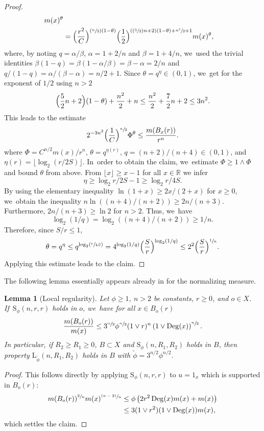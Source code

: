 \documentclass[10pt]{amsart}
\newcommand{\Psfrac}[2]{(\sfrac{#1}{#2})}
\newcommand{\psfrac}[2]{\sfrac{(#1)}{#2}}
\newcommand{\rS}{\mathrm{S}}
\newcommand{\rL}{\mathrm{L}}
\theoremstyle{plain}
\newtheorem{lemma}[theorem]{Lemma}
\theoremstyle{definition}
\newcommand{\RR}{\mathbb{R}}
\DeclareMathOperator{\Deg}{Deg}
\begin{document}
\begin{proof}
{\begin{align*}
m(x)^{{\theta}}
\\
&=\Bigl(\frac{r^2}{C }\Bigr)^{\Psfrac{n}{2}(1- {\theta})}
{\Bigl(\frac12\Bigr)^{(\Psfrac52n+2)(1-\theta)+\sfrac{n^2}{2}+1}}
m(x)^{{\theta}},
\end{align*}}
where, by noting $q=\alpha/\beta$, $\alpha=1+2/n$ and $\beta=1+4/n$, we~used the trivial identities $\beta(1-q)=\beta(1-\alpha/\beta)=\beta-\alpha=2/n$ and
$q/(1-q)=\alpha/(\beta-\alpha)=n/2+1$.
Since $ {\theta}=q^{{\eta}}\in(0,1)$, we~get for the exponent of $1/2$ using $ n>2 $
\[
\Bigl(\frac52n+2\Bigr)(1-\theta)+\frac{n^2}{2}+n
\leq \frac{n^2}{2}+\frac{7}{2}n+2 \leq 3 n^2.
\]
This leads to the estimate
\[
2^{-{3}n^2}\Bigl(\frac{1}{C}\Bigr)^{\sfrac{n}{2}}
\Phi^{\theta }
\leq \frac{m(B_x(r))}{r^{n}}.
\]
where $\Phi= C^{{n}/{2}}{m(x)}/{r^{n}} $,
$ \theta =q^{\eta(r)}$, $q=(n+2)/(n+4)\in(0,1)$, and {$ \eta(r)=\lfloor \log_2 (r/2S) \rfloor$}. In~order to obtain the claim, we~estimate $\Phi\geq 1\wedge \Phi$ and bound $\theta$ from above. From $\lfloor x\rfloor\geq x-1$ for all $x\in\RR$ we infer
\[
\eta\geq \log_2{r/2S}-1\geq \log_2{r/4S}.
\]
{By using the elementary inequality $ \ln (1+x)\ge 2x/(2+x) $ for $ x\ge 0 $, we~obtain the inequality
$ n\ln ((n+4)/(n+2))\ge 2n/(n+3) $. Furthermore, $ 2n/(n+3)\ge \ln 2 $ for $ n>2 $. Thus, we~have
\[
\log_2({1/q})=\log_2({(n+4)/(n+2)})\ge 1/n.
\]
}
Therefore, since $S/r\leq1$,
\[
\theta=q^{\eta}\leq {q}^{\log_2(\sfrac{r}{4S})}=4^{\log_2({1/q})}\Bigl(\frac{S}{r}\Bigr)^{\log_2({1/q})}\leq 2^2\Bigl(\frac{S}{r}\Bigr)^{\sfrac{1}{n}}.
\]
Applying this estimate leads to the claim.
\end{proof}

The following lemma essentially appears already in \cite[Lem.\,6.2]{KellerRose-22a} for the normalizing measure.

\begin{lemma}[Local regularity]
\label{lemma:gammanormalized} Let $\phi\geq 1$, $n>2$ be constants, $r \ge 0$, and $o\in X$. If~$\rS_{\phi}(n,r,r)$ holds in $ o $, we~have for all $x\in B_o(r)$
\[
\frac{m(B_o(r))}{m(x)}
\leq {3}^{\sfrac{n}{2}}\phi^{\sfrac{n}{2}}(1\vee r)^n\left(1\vee \Deg(x)\right)^{\sfrac{n}{2}}.
\]
In particular, if $R_2\geq R_1\geq 0$, $B\subset X$ and $\rS_\phi(n,R_1,R_2)$ holds in $B$, then property $\rL_{\tilde\phi}(n,R_1,R_2)$ holds in $B$ with $\tilde \phi={3}^{n/2}\phi^{n/2}$.
\end{lemma}
\begin{proof}
This follows directly by applying $\rS_{\phi}(n,r,r)$ to $ u=1_{x} $ which is supported in $ B_{o}(r) $:
\begin{align*}
m(B_o(r))^{\sfrac{2}{n}} m(x)^{\psfrac{n-2}{n}}&\leq \phi\left({2} r^2\Deg(x)m(x) +m(x)\right)\\
&\leq {3} (1\vee r^2)(1\vee \Deg(x))m(x),
\end{align*}
which settles the claim.
\end{proof}
\end{document}
